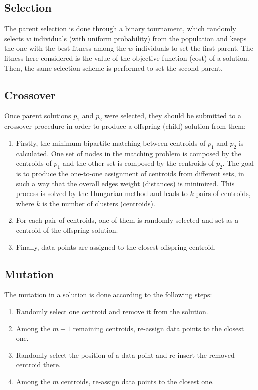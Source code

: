 \subsection{Selection}
The parent selection is done through a binary tournament, which randomly selects $w$ individuals (with uniform probability) from the population and keeps the one with the best fitness among the $w$ individuals to set the first parent. The fitness here considered is the value of the objective function (cost) of a solution. Then, the same selection scheme is performed to set the second parent.

\subsection{Crossover}
Once parent solutions $p_1$ and $p_2$ were selected, they should be submitted to a crossover procedure in order to produce a offspring (child) solution from them:

\begin{enumerate}
	\item Firstly, the minimum bipartite matching between centroids of $p_1$ and $p_2$ is calculated. One set of nodes in the matching problem is composed by the centroids of $p_1$ and the other set is composed by the centroids of $p_2$. The goal is to produce the one-to-one assignment of centroids from different sets, in such a way that the overall edges weight (distances) is minimized. This process is solved by the Hungarian method and leads to $k$ pairs of centroids, where $k$ is the number of clusters (centroids).

	\item For each pair of centroids, one of them is randomly selected and set as a centroid of the offspring solution.

	\item Finally, data points are assigned to the closest offspring centroid.
\end{enumerate}

\subsection{Mutation}
The mutation in a solution is done according to the following steps:

\begin{enumerate}

	\item Randomly select one centroid and remove it from the solution.
	
	\item Among the $m-1$ remaining centroids, re-assign data points to the closest one.
	
	\item Randomly select the position of a data point and re-insert the removed centroid there.
	
	\item Among the $m$ centroids, re-assign data points to the closest one.
	
\end{enumerate}


